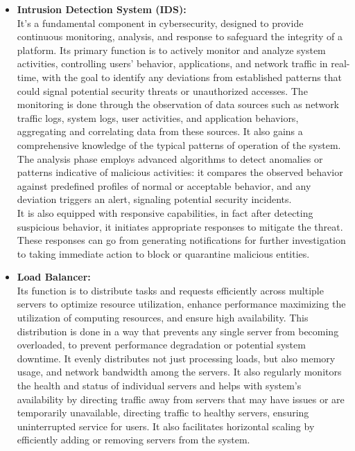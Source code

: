 \begin{itemize}
    \item \textbf{Intrusion Detection System (IDS):} \\
    It’s a fundamental component in cybersecurity, designed to provide continuous monitoring, analysis, and response to safeguard the integrity of a platform. Its primary function is to actively monitor and analyze system activities, controlling users’ behavior, applications, and network traffic in real-time, with the goal to identify any deviations from established patterns that could signal potential security threats or unauthorized accesses. The monitoring is done through the observation of data sources such as network traffic logs, system logs, user activities, and application behaviors, aggregating and correlating data from these sources. It also gains a comprehensive knowledge of the typical patterns of operation of the system. \\
    The analysis phase employs advanced algorithms to detect anomalies or patterns indicative of malicious activities: it compares the observed behavior against predefined profiles of normal or acceptable behavior, and any deviation triggers an alert, signaling potential security incidents. \\
    It is also equipped with responsive capabilities, in fact after detecting suspicious behavior, it initiates appropriate responses to mitigate the threat. These responses can go from generating notifications for further investigation to taking immediate action to block or quarantine malicious entities.

    \item \textbf{Load Balancer:} \\
    Its function is to distribute tasks and requests efficiently across multiple servers to optimize resource utilization, enhance performance maximizing the utilization of computing resources, and ensure high availability. This distribution is done in a way that prevents any single server from becoming overloaded, to prevent performance degradation or potential system downtime. It evenly distributes not just processing loads, but also memory usage, and network bandwidth among the servers. It also regularly monitors the health and status of individual servers and helps with system’s availability by directing traffic away from servers that may have issues or are temporarily unavailable, directing traffic to healthy servers, ensuring uninterrupted service for users. It also facilitates horizontal scaling by efficiently adding or removing servers from the system. 
    

\end{itemize}
